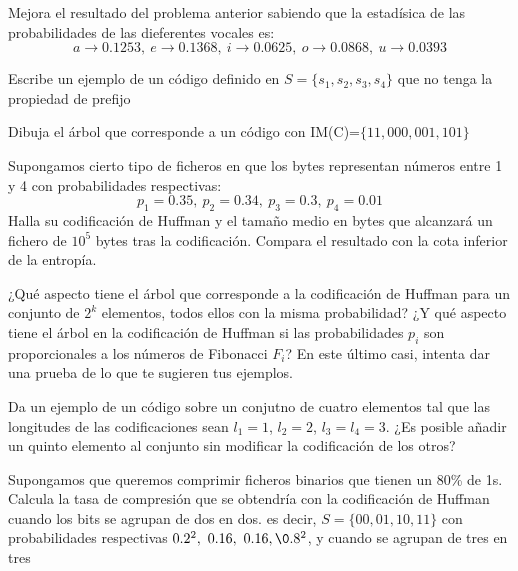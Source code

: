 \begin{problem}[7]
Mejora el resultado del problema anterior sabiendo que la estadísica de las probabilidades de las dieferentes vocales es:
\[a \to 0.1253, \ e \to 0.1368, \ i \to 0.0625, \ o \to 0.0868, \ u \to 0.0393\]
\solution
\end{problem}

\begin{problem}[8]
Escribe un ejemplo de un código definido en $S=\{s_1,s_2,s_3,s_4\}$ que no tenga la propiedad de prefijo
\solution
\end{problem}

\begin{problem}[9]
Dibuja el árbol que corresponde a un código con IM(C)=$\{11,000,001,101\}$
\solution
\end{problem}

\begin{problem}[10]
Supongamos cierto tipo de ficheros en que los bytes representan números entre 1 y 4 con probabilidades respectivas:
\[p_1 = 0.35, \ p_2=0.34, \ p_3 = 0.3, \ p_4=0.01\]
Halla su codificación de Huffman y el tamaño medio en bytes que alcanzará un fichero de $10^5$ bytes tras la codificación. Compara el resultado con la cota inferior de la entropía.
\solution
\end{problem}

\begin{problem}[11]
¿Qué aspecto tiene el árbol que corresponde a la codificación de Huffman para un conjunto de $2^k$ elementos, todos ellos con la misma probabilidad? ¿Y qué aspecto tiene el árbol en la codificación de Huffman si las probabilidades $p_i$ son proporcionales a los números de Fibonacci $F_i$? En este último casi, intenta dar una prueba de lo que te sugieren tus ejemplos.
\solution
\end{problem}

\begin{problem}[12]
Da un ejemplo de un código sobre un conjutno de cuatro elementos tal que las longitudes de las codificaciones sean $l_1=1$, $l_2=2$, $l_3=l_4=3$. ¿Es posible añadir un quinto elemento al conjunto sin modificar la codificación de los otros?
\solution
\end{problem}

\begin{problem}[13]
Supongamos que queremos comprimir ficheros binarios que tienen un 80\% de 1s. Calcula la tasa de compresión que se obtendría con la codificación de Huffman cuando los bits se agrupan de dos en dos. es decir, $S=\{00,01,10,11\}$ con probabilidades respectivas $0.2^2, \ 0.16, \ 0.16, \0.8^2$, y cuando se agrupan de tres en tres
\solution
\end{problem}

